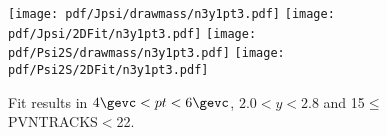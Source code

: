 \begin{figure}[H]
\begin{center}
\texttt{[image: pdf/Jpsi/drawmass/n3y1pt3.pdf]}
\texttt{[image: pdf/Jpsi/2DFit/n3y1pt3.pdf]}
\vspace*{-0.5cm}
\texttt{[image: pdf/Psi2S/drawmass/n3y1pt3.pdf]}
\texttt{[image: pdf/Psi2S/2DFit/n3y1pt3.pdf]}
\vspace*{-0.5cm}
\end{center}
\caption{Fit results in $4\gevc<pt<6\gevc$, $2.0<y<2.8$ and 15$\leq$PVNTRACKS$<$22.}
\label{Fitn3y1pt3}
\end{figure}
